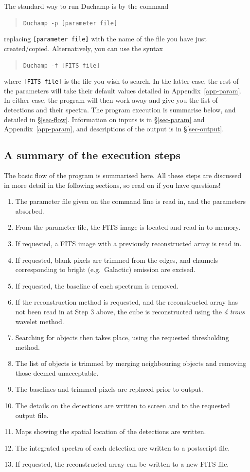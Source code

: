 \documentclass[12pt,a4paper]{article}
\newcommand{\eg}{e.g.\ }
\begin{document}
The standard way to run Duchamp is by the command
\begin{quote}
{\tt Duchamp -p [parameter file]}
\end{quote}
replacing {\tt [parameter file]} with the name of the file you have
just created/copied. Alternatively, you can use the syntax
\begin{quote}
{\tt Duchamp -f [FITS file]}
\end{quote}
where {\tt [FITS file]} is the file you wish to search. In the latter
case, the rest of the parameters will take their default values
detailed in Appendix~\ref{app-param}. In either case, the program will
then work away and give you the list of detections and their
spectra. The program execution is summarise below, and detailed in
\S\ref{sec-flow}. Information on inputs is in \S\ref{sec-param} and
Appendix~\ref{app-param}, and descriptions of the output is in
\S\ref{sec-output}.

\subsection{A summary of the execution steps}

The basic flow of the program is summarised here. All these steps are
discussed in more detail in the following sections, so read on if
you have questions!
\begin{enumerate}
\item The parameter file given on the command line is read in, and the
  parameters absorbed.
\item From the parameter file, the FITS image is located and read in
  to memory.
\item If requested, a FITS image with a previously reconstructed array
  is read in.
\item If requested, blank pixels are trimmed from the edges, and
  channels corresponding to bright (\eg Galactic) emission are
  excised. 
\item If requested, the baseline of each spectrum is removed.
\item If the reconstruction method is requested, and the reconstructed
  array has not been read in at Step 3 above, the cube is
  reconstructed using the {\it {\' a} trous} wavelet method.
\item Searching for objects then takes place, using the requested
  thresholding method.
\item The list of objects is trimmed by merging neighbouring objects
  and removing those deemed unacceptable.
\item The baselines and trimmed pixels are replaced prior to output.
\item The details on the detections are written to screen and to the
  requested output file.
\item Maps showing the spatial location of the detections are written.
\item The integrated spectra of each detection are written to a
  postscript file. 
\item If requested, the reconstructed array can be written to a new
  FITS file.
\end{enumerate}
\end{document}
